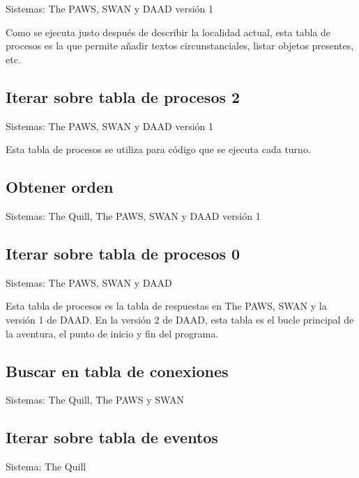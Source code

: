 \documentclass[11pt, a5paper]{article}
\newcommand{\quill}{\textsf{The Quill}\xspace}
\newcommand{\paw}{\textsf{The PAWS}\xspace}
\newcommand{\swan}{\textsf{SWAN}\xspace}
\newcommand{\daad}{\textsf{DAAD}\xspace}
\newcommand{\sistema}[1]{\noindent Sistema: #1 \nopagebreak}
\newcommand{\sistemas}[1]{\noindent Sistemas: #1 \nopagebreak}
\begin{document}
\sistemas{\paw, \swan y \daad versión 1}

Como se ejecuta justo después de describir la localidad actual, esta tabla de procesos es la que permite añadir textos circunstanciales, listar objetos presentes, etc.

\subsection{Iterar sobre tabla de procesos 2}

\sistemas{\paw, \swan y \daad versión 1}

Esta tabla de procesos se utiliza para código que se ejecuta cada turno.

\subsection{Obtener orden}

\sistemas{\quill, \paw, \swan y \daad versión 1}

\subsection{Iterar sobre tabla de procesos 0}

\sistemas{\paw, \swan y \daad}

Esta tabla de procesos es la tabla de respuestas en \paw, \swan y la versión 1 de \daad. En la versión 2 de \daad, esta tabla es el bucle principal de la aventura, el punto de inicio y fin del programa.

\subsection{Buscar en tabla de conexiones}

\sistemas{\quill, \paw y \swan}

\subsection{Iterar sobre tabla de eventos}

\sistema{\quill}
\end{document}
